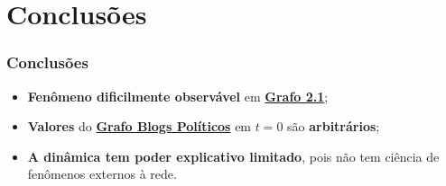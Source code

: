 
\section{Conclusões}

\begin{frame}
  \frametitle{Conclusões}

  \begin{alertblock}{}
    \vspace{5mm}

    \begin{itemize}
      \item \textbf{\alert{Fenômeno dificilmente observável}} em
        \hyperlink{page.21}{\textbf{Grafo 2.1}};
      \vspace{5mm}

      \item \textbf{\alert{Valores}} do \hyperlink{page.21}{\textbf{Grafo Blogs Políticos}}
        em $t = 0$ são \textbf{\alert{arbitrários}};
      \vspace{5mm}

      \item \textbf{\alert{A dinâmica tem poder explicativo limitado}}, pois não
        tem ciência de fenômenos externos à rede.
    \end{itemize}
    \vspace{5mm}

  \end{alertblock}
\end{frame}
